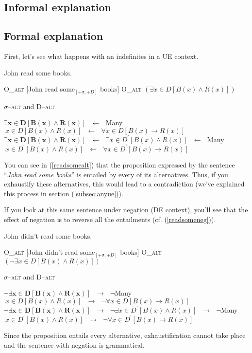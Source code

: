 \documentclass[a4paper,11pt]{article}
\newcommand{\reff}[1]{(\ref{#1})}
\newcommand{\exs}[2][]{\begin{exe}\ex #1 \begin{xlist}#2\end{xlist}\end{exe}}
\begin{document}
\subsection{Informal explanation}

\subsection{Formal explanation}
First, let's see what happens with an indefinites in a UE context.

\exs{
  \ex\label{readsome} John read some books.
  \ex
    \begin{xlist}
      \ex\label{readsomeo} O_{\textsc{alt}} [John read some$_{[+\sigma,+D]}$ books]
      \ex O_{\textsc{alt}} $(\exists{x \in D}[B(x) \wedge R(x)])$
    \end{xlist}
  \ex\label{readsomealt} $\sigma$--\textsc{alt} and D--\textsc{alt}
    \begin{xlist}
      \ex $\boldsymbol{\exists{x \in D}[B(x) \wedge R(x)]}~~~\longleftarrow~~~$Many$~{x \in D}[B(x) \wedge R(x)]~~~\longleftarrow~~~\forall{x \in D}[B(x) \rightarrow R(x)]$
      \ex $\boldsymbol{\exists{x \in D}[B(x) \wedge R(x)]}~~~\longleftarrow~~~\exists{x \in D^{\prime}}[B(x) \wedge R(x)]~~~\longleftarrow~~~$Many$~{x \in D^{\prime}}[B(x) \wedge R(x)]~~~\longleftarrow~~~\forall{x \in D^{\prime}}[B(x) \rightarrow R(x)]$
    \end{xlist}
}
%
You can see in \reff{readsomealt} that the proposition expressed by the sentence \enquote{\emph{John read some books}} is entailed by every of its alternatives. Thus, if you exhaustify these alternatives, this would lead to a contradiction (we've explained this process in section \reff{subsec:anyue}).

If you look at this same sentence under negation (DE context), you'll see that the effect of negation is to reverse all the entailments (cf. \reff{readsomeneg}).

\exs[\label{readsomeneg}]{
  \ex John didn't read some books.
  \ex
    \begin{xlist}
      \ex\label{readsomeoneg} O_{\textsc{alt}} [John didn't read some$_{[+\sigma,+D]}$ books]
      \ex O_{\textsc{alt}} $(\neg \exists{x \in D}[B(x) \wedge R(x)])$
    \end{xlist}
  \ex\label{readsomealtneg} $\sigma$--\textsc{alt} and D--\textsc{alt}
    \begin{xlist}
      \ex $\boldsymbol{\neg \exists{x \in D}[B(x) \wedge R(x)]}~~~\longrightarrow~~~\neg $Many$~{x \in D}[B(x) \wedge R(x)]~~~\longrightarrow~~~\neg \forall{x \in D}[B(x) \rightarrow R(x)]$
      \ex $\boldsymbol{\neg \exists{x \in D}[B(x) \wedge R(x)]}~~~\longrightarrow~~~\neg \exists{x \in D^{\prime}}[B(x) \wedge R(x)]~~~\longrightarrow~~~\neg $Many$~{x \in D^{\prime}}[B(x) \wedge R(x)]~~~\longrightarrow~~~\neg \forall{x \in D^{\prime}}[B(x) \rightarrow R(x)]$
    \end{xlist}
}
%
Since the proposition entails every alternative, exhaustification cannot take place and the sentence with negation is grammatical.
\end{document}
